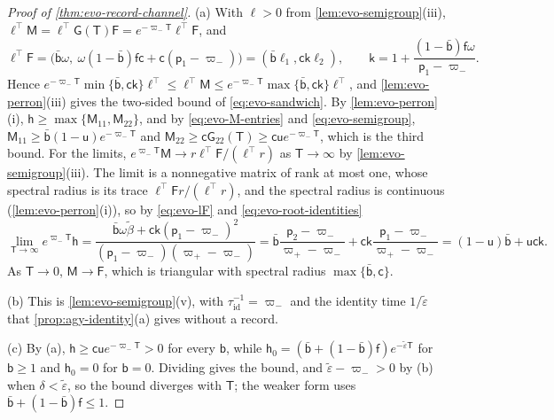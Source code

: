 \begin{proof}[Proof of \cref{thm:evo-record-channel}]
(a) With $\ell>0$ from \cref{lem:evo-semigroup}(iii), $\ell^\top\mathsf M=\ell^\top\mathsf G(\mathsf T)\mathsf F=e^{-\varpi_-\mathsf T}\ell^\top\mathsf F$, and
\begin{equation}\label{eq:evo-lF}
\ell^\top\mathsf F=\bigl(\bar{\mathsf b}\omega,\ \omega(1-\bar{\mathsf b})\mathsf f\mathsf c+\mathsf c(\mathsf p_1-\varpi_-)\bigr)=(\bar{\mathsf b}\ell_1,\mathsf c\mathsf k\ell_2),\qquad\mathsf k=1+\frac{(1-\bar{\mathsf b})\mathsf f\omega}{\mathsf p_1-\varpi_-}.
\end{equation}
Hence $e^{-\varpi_-\mathsf T}\min\{\bar{\mathsf b},\mathsf c\mathsf k\}\ell^\top\le\ell^\top\mathsf M\le e^{-\varpi_-\mathsf T}\max\{\bar{\mathsf b},\mathsf c\mathsf k\}\ell^\top$, and \cref{lem:evo-perron}(iii) gives the two-sided bound of \eqref{eq:evo-sandwich}. By \cref{lem:evo-perron}(i), $\mathsf h\ge\max\{\mathsf M_{11},\mathsf M_{22}\}$, and by \eqref{eq:evo-M-entries} and \eqref{eq:evo-semigroup}, $\mathsf M_{11}\ge\bar{\mathsf b}(1-\mathsf u)e^{-\varpi_-\mathsf T}$ and $\mathsf M_{22}\ge\mathsf c\mathsf G_{22}(\mathsf T)\ge\mathsf c\mathsf ue^{-\varpi_-\mathsf T}$, which is the third bound. For the limits, $e^{\varpi_-\mathsf T}\mathsf M\to r\ell^\top\mathsf F/(\ell^\top r)$ as $\mathsf T\to\infty$ by \cref{lem:evo-semigroup}(iii). The limit is a nonnegative matrix of rank at most one, whose spectral radius is its trace $\ell^\top\mathsf Fr/(\ell^\top r)$, and the spectral radius is continuous (\cref{lem:evo-perron}(i)), so by \eqref{eq:evo-lF} and \eqref{eq:evo-root-identities}
\begin{equation*}
\lim_{\mathsf T\to\infty}e^{\varpi_-\mathsf T}\mathsf h=\frac{\bar{\mathsf b}\omega\tilde\beta+\mathsf c\mathsf k(\mathsf p_1-\varpi_-)^2}{(\mathsf p_1-\varpi_-)(\varpi_+-\varpi_-)}=\bar{\mathsf b}\frac{\mathsf p_2-\varpi_-}{\varpi_+-\varpi_-}+\mathsf c\mathsf k\frac{\mathsf p_1-\varpi_-}{\varpi_+-\varpi_-}=(1-\mathsf u)\bar{\mathsf b}+\mathsf u\mathsf c\mathsf k.
\end{equation*}
As $\mathsf T\to0$, $\mathsf M\to\mathsf F$, which is triangular with spectral radius $\max\{\bar{\mathsf b},\mathsf c\}$.

(b) This is \cref{lem:evo-semigroup}(v), with $\tau_{\mathrm{id}}^{-1}=\varpi_-$ and the identity time $1/\tilde\varepsilon$ that \cref{prop:agy-identity}(a) gives without a record.

(c) By (a), $\mathsf h\ge\mathsf c\mathsf ue^{-\varpi_-\mathsf T}>0$ for every $\mathsf b$, while $\mathsf h_0=(\bar{\mathsf b}+(1-\bar{\mathsf b})\mathsf f)e^{-\tilde\varepsilon\mathsf T}$ for $\mathsf b\ge1$ and $\mathsf h_0=0$ for $\mathsf b=0$. Dividing gives the bound, and $\tilde\varepsilon-\varpi_->0$ by (b) when $\delta<\tilde\varepsilon$, so the bound diverges with $\mathsf T$; the weaker form uses $\bar{\mathsf b}+(1-\bar{\mathsf b})\mathsf f\le1$.


\end{proof}
